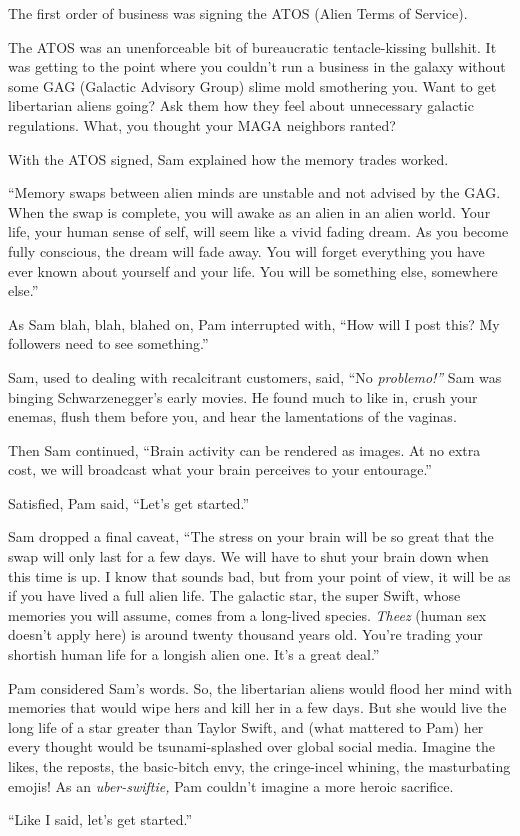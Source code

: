 The first order of business was signing the ATOS (Alien Terms of
Service).

The ATOS was an unenforceable bit of bureaucratic tentacle-kissing
bullshit. It was getting to the point where you couldn't run a business
in the galaxy without some GAG (Galactic Advisory Group) slime mold
smothering you. Want to get libertarian aliens going? Ask them how they
feel about unnecessary galactic regulations. What, you thought your MAGA
neighbors ranted?

With the ATOS signed, Sam explained how the memory trades worked.

``Memory swaps between alien minds are unstable and not advised by the
GAG. When the swap is complete, you will awake as an alien in an alien
world. Your life, your human sense of self, will seem like a vivid
fading dream. As you become fully conscious, the dream will fade away.
You will forget everything you have ever known about yourself and your
life. You will be something else, somewhere else.''

As Sam blah, blah, blahed on, Pam interrupted with, ``How will I post
this? My followers need to see something.''

Sam, used to dealing with recalcitrant customers, said, ``No
\emph{problemo!''} Sam was binging Schwarzenegger's early movies. He
found much to like in, crush your enemas, flush them before you, and
hear the lamentations of the vaginas.

Then Sam continued, ``Brain activity can be rendered as images. At no
extra cost, we will broadcast what your brain perceives to your
entourage.''

Satisfied, Pam said, ``Let's get started.''

Sam dropped a final caveat, ``The stress on your brain will be so great
that the swap will only last for a few days. We will have to shut your
brain down when this time is up. I know that sounds bad, but from your
point of view, it will be as if you have lived a full alien life. The
galactic star, the super Swift, whose memories you will assume, comes
from a long-lived species. \emph{Theez} (human sex doesn't apply here)
is around twenty thousand years old. You're trading your shortish human
life for a longish alien one. It's a great deal.''

Pam considered Sam's words. So, the libertarian aliens would flood her
mind with memories that would wipe hers and kill her in a few days. But
she would live the long life of a star greater than Taylor Swift, and
(what mattered to Pam) her every thought would be tsunami-splashed over
global social media. Imagine the likes, the reposts, the basic-bitch
envy, the cringe-incel whining, the masturbating emojis! As an
\emph{uber-swiftie,} Pam couldn't imagine a more heroic sacrifice.

``Like I said, let's get started.''


%

